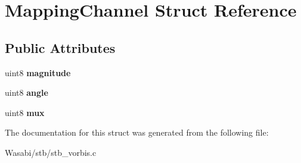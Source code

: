 \hypertarget{struct_mapping_channel}{}\section{Mapping\+Channel Struct Reference}
\label{struct_mapping_channel}
\subsection*{Public Attributes}
\begin{DoxyCompactItemize}
\item 
uint8 {\bfseries magnitude}\hypertarget{struct_mapping_channel_afd6e4cb4de3874833192c5c67daaa272}{}\label{struct_mapping_channel_afd6e4cb4de3874833192c5c67daaa272}

\item 
uint8 {\bfseries angle}\hypertarget{struct_mapping_channel_a78fa29206ca367159792f11c1f604510}{}\label{struct_mapping_channel_a78fa29206ca367159792f11c1f604510}

\item 
uint8 {\bfseries mux}\hypertarget{struct_mapping_channel_a293cfec33390fdd5cee99df910f2d694}{}\label{struct_mapping_channel_a293cfec33390fdd5cee99df910f2d694}

\end{DoxyCompactItemize}


The documentation for this struct was generated from the following file\+:\begin{DoxyCompactItemize}
\item 
Wasabi/stb/stb\+\_\+vorbis.\+c\end{DoxyCompactItemize}
